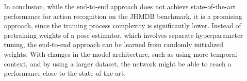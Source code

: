 In conclusion, while the end-to-end approach does not achieve state-of-the-art performance for action recognition on the JHMDB benchmark, it is a promising approach, since the training process complexity is significantly lower.
Instead of pretraining weights of a pose estimator, which involves separate hyperparameter tuning, the end-to-end approach can be learned from randomly initialized weights.
With changes in the model architecture, such as using more temporal context, and by using a larger dataset, the network might be able to reach a performance close to the state-of-the-art.
